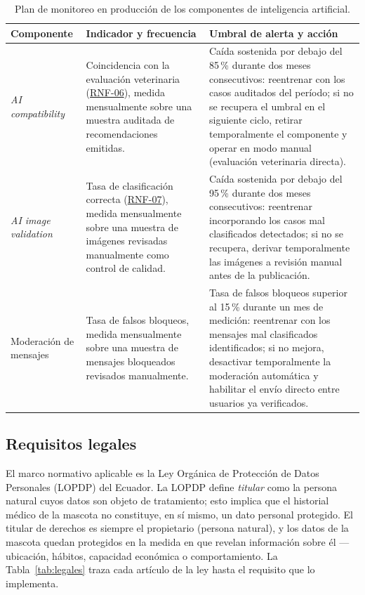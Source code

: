 \documentclass[journal,onecolumn]{IEEEtran}
\begin{document}
\begin{table}[H]
	\centering
	\caption{Plan de monitoreo en producción de los componentes de inteligencia artificial.}
	\label{tab:monitoreo-ia}
	\small
	\begin{tabularx}{\textwidth}{@{}p{2.0cm} X p{4.3cm}@{}}
		\toprule
		\textbf{Componente} & \textbf{Indicador y frecuencia} & \textbf{Umbral de alerta y acción} \\
		\midrule
		\emph{AI compatibility} & Coincidencia con la evaluación veterinaria (\hyperref[tab:RNF-06]{RNF-06}), medida mensualmente sobre una muestra auditada de recomendaciones emitidas. & Caída sostenida por debajo del 85\,\% durante dos meses consecutivos: reentrenar con los casos auditados del período; si no se recupera el umbral en el siguiente ciclo, retirar temporalmente el componente y operar en modo manual (evaluación veterinaria directa). \\
		\addlinespace
		\emph{AI image validation} & Tasa de clasificación correcta (\hyperref[tab:RNF-07]{RNF-07}), medida mensualmente sobre una muestra de imágenes revisadas manualmente como control de calidad. & Caída sostenida por debajo del 95\,\% durante dos meses consecutivos: reentrenar incorporando los casos mal clasificados detectados; si no se recupera, derivar temporalmente las imágenes a revisión manual antes de la publicación. \\
		\addlinespace
		Moderación de mensajes & Tasa de falsos bloqueos, medida mensualmente sobre una muestra de mensajes bloqueados revisados manualmente. & Tasa de falsos bloqueos superior al 15\,\% durante un mes de medición: reentrenar con los mensajes mal clasificados identificados; si no mejora, desactivar temporalmente la moderación automática y habilitar el envío directo entre usuarios ya verificados. \\
		\bottomrule
	\end{tabularx}
\end{table}

	\newpage
	\subsection{Requisitos legales}
	\label{sec:legales}
	
	El marco normativo aplicable es la Ley Orgánica de Protección de Datos Personales
	(LOPDP) del Ecuador. La LOPDP define \emph{titular} como la persona natural cuyos
	datos son objeto de tratamiento; esto implica que el historial médico de la mascota
	no constituye, en sí mismo, un dato personal protegido. El titular de derechos es
	siempre el propietario (persona natural), y los datos de la mascota quedan
	protegidos en la medida en que revelan información sobre él --- ubicación, hábitos,
	capacidad económica o comportamiento. La Tabla~\ref{tab:legales} traza cada
	artículo de la ley hasta el requisito que lo implementa.
	
\end{document}
